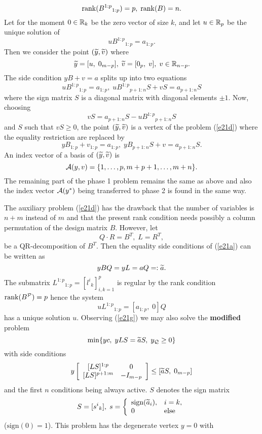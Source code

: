 \[
\rank (B^{1:p}{}_{1:p}) = p, \; \rank (B) = n.
\]
Let for the moment $0 \in \Bbb{R}_k$ be the zero vector of size $k$, and let
$u \in \Bbb{R}_p$ be the unique solution of
\[
uB^{1:p}{}_{1:p} = a_{1:p}.
\]
Then we consider the point $(\wi{y},\wi{v})$ where
\[
\wi{y} = [u, \; 0_{m-p}], \; \wi{v} = [0_p, \; v], \; v \in \Bbb{R}_{n-p}.
\]
The side condition $yB + v = a$ splits up into two equations
\[
uB^{1:p}{}_{1:p} = a_{1:p}, \;
uB^{1:p}{}_{p+1:n}S + vS = a_{p+1:n}S
\]
where the sign matrix $S$ is a diagonal matrix with diagonal elements $\pm 1$.
Now, choosing
\[
vS = a_{p+1:n}S - uB^{1:p}{}_{p+1:n}S
\]
and $S$ such that $vS \geq 0$, the point $(\wi{y}, \wi{v})$ is a vertex of the
problem (\ref{e21d}) where the equality restriction are replaced by
\[
yB_{1:p} + v_{1:p} = a_{1:p}, \; yB_{p+1:n}S + v = a_{p+1:n}S.
\]
An index vector of a basis of $(\wi{y}, \wi{v})$ is
\[
\A(y,v) = \{1, \ldots, p, m+p+1, \ldots , m+n\}.
\]
The remaining part of the phase 1 problem remains the same as above and also
the index vector $\A(y^*)$ being transferred to phase 2 is found in the same
way.
\par
The auxiliary problem (\ref{e21d}) has the drawback that the number of
variables is $n+m$ instead of $m$ and that the present rank condition needs
possibly a column permutation of the design matrix $B$.  However, let
\[
Q \cdot R = B^T, \; L = R^T,
\]
be a QR-decomposition of $B^T$. Then the equality side conditions of
(\ref{e21a}) can be written as
%
\begin{equation} \label{e21g}
yBQ = yL = aQ =: \wi{a}.
\end{equation}
%
The submatrix $L^{1:p}{}_{1:p} = [l^i{}_k]_{i,k=1}^p$ is regular by the rank
condition $\rank (B^{\P}) = p$ hence the system
\[
uL^{1:p}{}_{1:p} = [a_{1:p}, \; 0]Q
\]
has a unique solution $u$.  Observing (\ref{e21g}) we may also solve the {\bf
modified} problem
%
\begin{equation} \label{e21h}
\min \{yc, \; yLS = \wi{a}S, \; y_{\Q} \geq 0 \}
\end{equation}
%
with side conditions
\[
y\ba{[}{cc}[LS]^{1:p} & 0\\[0mm]
           [LS]^{p+1:m} & -I_{m-p} \ea{]} \leq [\wi{a}S, \; 0_{m-p}]
\]
and the first $n$ conditions being always active. $S$ denotes the sign matrix
\[
S = [s^{i}{}_k], \; s = \ba{\{}{ll} \mbox{sign}(\wi{a}_i), & i = k,\\
                                    0              & \mbox{else}
                        \ea{.}
\]
($\mbox{sign}(0) = 1$). This problem has the degenerate vertex $y = 0$ with
